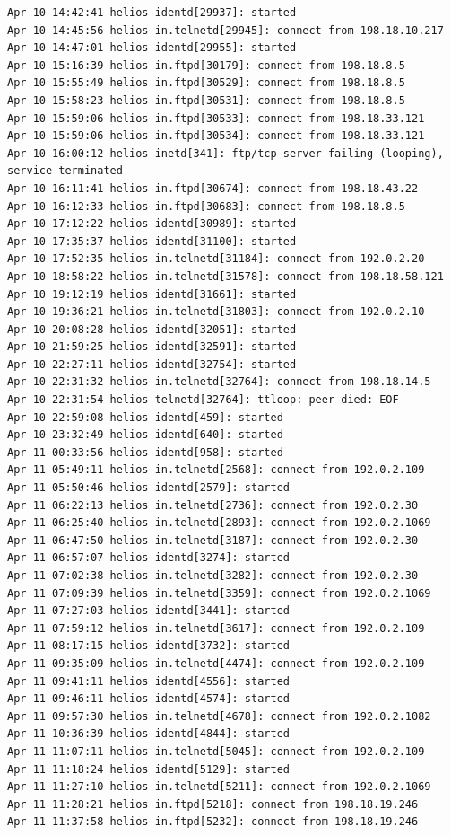 \begin{lstlisting}[style=terminal]
Apr 10 14:42:41 helios identd[29937]: started
Apr 10 14:45:56 helios in.telnetd[29945]: connect from 198.18.10.217
Apr 10 14:47:01 helios identd[29955]: started
Apr 10 15:16:39 helios in.ftpd[30179]: connect from 198.18.8.5
Apr 10 15:55:49 helios in.ftpd[30529]: connect from 198.18.8.5
Apr 10 15:58:23 helios in.ftpd[30531]: connect from 198.18.8.5
Apr 10 15:59:06 helios in.ftpd[30533]: connect from 198.18.33.121
Apr 10 15:59:06 helios in.ftpd[30534]: connect from 198.18.33.121
Apr 10 16:00:12 helios inetd[341]: ftp/tcp server failing (looping), service terminated
Apr 10 16:11:41 helios in.ftpd[30674]: connect from 198.18.43.22
Apr 10 16:12:33 helios in.ftpd[30683]: connect from 198.18.8.5
Apr 10 17:12:22 helios identd[30989]: started
Apr 10 17:35:37 helios identd[31100]: started
Apr 10 17:52:35 helios in.telnetd[31184]: connect from 192.0.2.20
Apr 10 18:58:22 helios in.telnetd[31578]: connect from 198.18.58.121
Apr 10 19:12:19 helios identd[31661]: started
Apr 10 19:36:21 helios in.telnetd[31803]: connect from 192.0.2.10
Apr 10 20:08:28 helios identd[32051]: started
Apr 10 21:59:25 helios identd[32591]: started
Apr 10 22:27:11 helios identd[32754]: started
Apr 10 22:31:32 helios in.telnetd[32764]: connect from 198.18.14.5
Apr 10 22:31:54 helios telnetd[32764]: ttloop: peer died: EOF
Apr 10 22:59:08 helios identd[459]: started
Apr 10 23:32:49 helios identd[640]: started
Apr 11 00:33:56 helios identd[958]: started
Apr 11 05:49:11 helios in.telnetd[2568]: connect from 192.0.2.109
Apr 11 05:50:46 helios identd[2579]: started
Apr 11 06:22:13 helios in.telnetd[2736]: connect from 192.0.2.30
Apr 11 06:25:40 helios in.telnetd[2893]: connect from 192.0.2.1069
Apr 11 06:47:50 helios in.telnetd[3187]: connect from 192.0.2.30
Apr 11 06:57:07 helios identd[3274]: started
Apr 11 07:02:38 helios in.telnetd[3282]: connect from 192.0.2.30
Apr 11 07:09:39 helios in.telnetd[3359]: connect from 192.0.2.1069
Apr 11 07:27:03 helios identd[3441]: started
Apr 11 07:59:12 helios in.telnetd[3617]: connect from 192.0.2.109
Apr 11 08:17:15 helios identd[3732]: started
Apr 11 09:35:09 helios in.telnetd[4474]: connect from 192.0.2.109
Apr 11 09:41:11 helios identd[4556]: started
Apr 11 09:46:11 helios identd[4574]: started
Apr 11 09:57:30 helios in.telnetd[4678]: connect from 192.0.2.1082
Apr 11 10:36:39 helios identd[4844]: started
Apr 11 11:07:11 helios in.telnetd[5045]: connect from 192.0.2.109
Apr 11 11:18:24 helios identd[5129]: started
Apr 11 11:27:10 helios in.telnetd[5211]: connect from 192.0.2.1069
Apr 11 11:28:21 helios in.ftpd[5218]: connect from 198.18.19.246
Apr 11 11:37:58 helios in.ftpd[5232]: connect from 198.18.19.246

\end{lstlisting}
